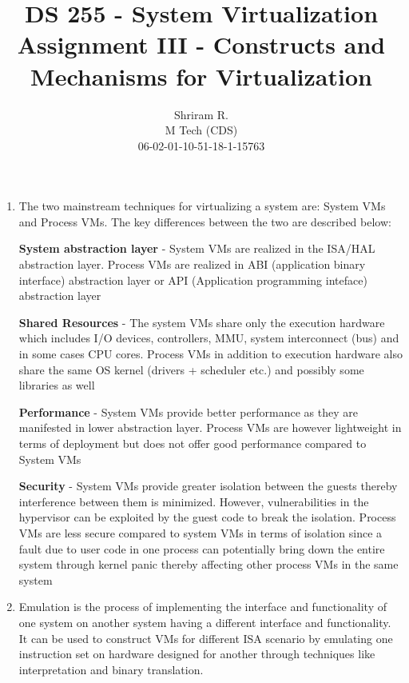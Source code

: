 \documentclass[11pt,a4paper,oneside]{article}
\begin{document}
	\title{DS 255 - System Virtualization \\ Assignment III - Constructs and Mechanisms for Virtualization}
	\author{Shriram R. \\ M Tech (CDS) \\ 06-02-01-10-51-18-1-15763}
	\maketitle	
	
	\begin{enumerate}
		\item The two mainstream techniques for virtualizing a system are: System VMs and Process VMs. The key differences between the two are described below:
		
		\textbf{System abstraction layer} - System VMs are realized in the ISA/HAL abstraction layer. Process VMs are realized in ABI (application binary interface) abstraction layer or API (Application programming inteface) abstraction layer
		
		\textbf{Shared Resources} - The system VMs share only the execution hardware which includes I/O devices, controllers, MMU, system interconnect (bus) and in some cases CPU cores. Process VMs in addition to execution hardware also share the same OS kernel (drivers + scheduler etc.) and possibly some libraries as well
		
		\textbf{Performance} - System VMs provide better performance as they are manifested in lower abstraction layer. Process VMs are however lightweight in terms of deployment but does not offer good performance compared to System VMs
		
		\textbf{Security} - System VMs provide greater isolation between the guests thereby interference between them is minimized. However, vulnerabilities in the hypervisor can be exploited by the guest code to break the isolation. Process VMs are less secure compared to system VMs in terms of isolation since a fault due to user code in one process can potentially bring down the entire system through kernel panic thereby affecting other process VMs in the same system
		
		\item Emulation is the process of implementing the interface and functionality of one system on another system having a different interface and functionality. It can be used to construct VMs for different ISA scenario by emulating one instruction set on hardware designed for another through techniques like interpretation and binary translation.
		

\end{enumerate}
\end{document}
